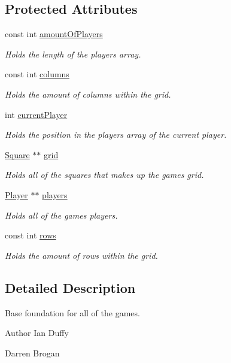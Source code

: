 \subsection*{Protected Attributes}
\begin{DoxyCompactItemize}
\item 
const int \hyperlink{classGame_a2a64a5ac5fe7466f02392d7bc75cf372}{amount\-Of\-Players}
\begin{DoxyCompactList}\small\item\em Holds the length of the players array. \end{DoxyCompactList}\item 
const int \hyperlink{classGame_a33dcee5dd512148a0b12aa7fba41b5da}{columns}
\begin{DoxyCompactList}\small\item\em Holds the amount of columns within the grid. \end{DoxyCompactList}\item 
int \hyperlink{classGame_af57daa2f1aef9f264c18b462f8294e52}{current\-Player}
\begin{DoxyCompactList}\small\item\em Holds the position in the players array of the current player. \end{DoxyCompactList}\item 
\hyperlink{classSquare}{Square} $\ast$$\ast$ \hyperlink{classGame_a44fda9d5235865323c59d95b1f59b459}{grid}
\begin{DoxyCompactList}\small\item\em Holds all of the squares that makes up the games grid. \end{DoxyCompactList}\item 
\hyperlink{classPlayer}{Player} $\ast$$\ast$ \hyperlink{classGame_ad82f617ca44c8996333c7f41c410a56b}{players}
\begin{DoxyCompactList}\small\item\em Holds all of the games players. \end{DoxyCompactList}\item 
const int \hyperlink{classGame_ae882486dec6d9507bbef7f44aaf07db5}{rows}
\begin{DoxyCompactList}\small\item\em Holds the amount of rows within the grid. \end{DoxyCompactList}\end{DoxyCompactItemize}


\subsection{Detailed Description}
Base foundation for all of the games. \begin{DoxyAuthor}{Author}
Ian Duffy 

Darren Brogan 
\end{DoxyAuthor}


